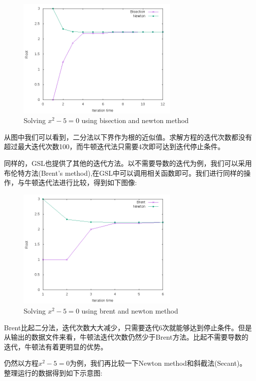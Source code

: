 \documentclass{ctexart}
\begin{document}
\begin{figure}[H]
  \centering
  \includegraphics[width=0.7\textwidth]{graph1.png}
  \caption{Solving $x^2-5=0$ using bisection and newton method}
\end{figure}

从图中我们可以看到，二分法以下界作为根的近似值。求解方程的迭代次数都没有超过最大迭代次数100，而牛顿迭代法只需要4次即可达到迭代停止条件。

同样的，GSL也提供了其他的迭代方法。以不需要导数的迭代为例，我们可以采用布伦特方法(Brent's method),在GSL中可以调用相关函数即可。我们进行同样的操作，与牛顿迭代法进行比较，得到如下图像:

\begin{figure}[H]
  \centering
  \includegraphics[width=0.7\textwidth]{graph2.png}
  \caption{Solving $x^2-5=0$ using brent and newton method}
\end{figure}

Brent比起二分法，迭代次数大大减少，只需要迭代6次就能够达到停止条件。但是从输出的数据文件来看，牛顿法迭代次数仍然少于Brent方法。比起不需要导数的迭代，牛顿法有着更明显的优势。

仍然以方程$x^2-5=0$为例，我们再比较一下Newton method和斜截法(Secant)。整理运行的数据得到如下示意图:
\end{document}
